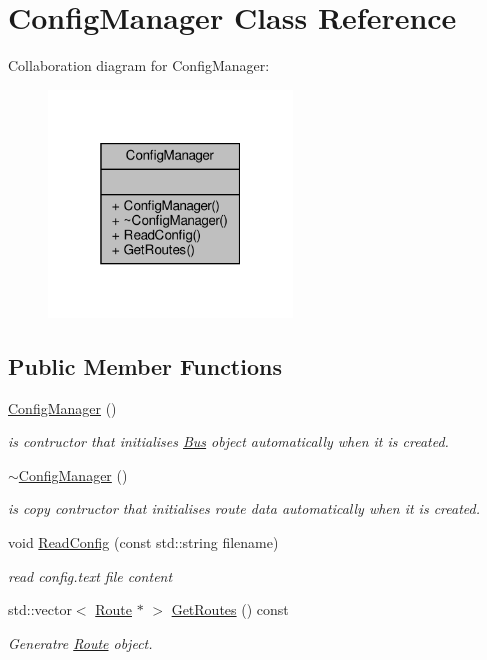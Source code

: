 \hypertarget{classConfigManager}{}\section{Config\+Manager Class Reference}
\label{classConfigManager}


Collaboration diagram for Config\+Manager\+:\nopagebreak
\begin{figure}[H]
\begin{center}
\leavevmode
\includegraphics[width=184pt]{classConfigManager__coll__graph}
\end{center}
\end{figure}
\subsection*{Public Member Functions}
\begin{DoxyCompactItemize}
\item 
\hyperlink{classConfigManager_a7d3d7c10423d969f7544509f6fcca32f}{Config\+Manager} ()
\begin{DoxyCompactList}\small\item\em is contructor that initialises \hyperlink{classBus}{Bus} object automatically when it is created. \end{DoxyCompactList}\item 
\hyperlink{classConfigManager_a7fa65fdff98bdd5bbbf72196bd9ccf17}{$\sim$\+Config\+Manager} ()
\begin{DoxyCompactList}\small\item\em is copy contructor that initialises route data automatically when it is created. \end{DoxyCompactList}\item 
void \hyperlink{classConfigManager_ab8087a9f44ddaa001ea361b56514e64a}{Read\+Config} (const std\+::string filename)
\begin{DoxyCompactList}\small\item\em read config.\+text file content \end{DoxyCompactList}\item 
std\+::vector$<$ \hyperlink{classRoute}{Route} $\ast$ $>$ \hyperlink{classConfigManager_a0db6329b7dd5ac1f92ee262c30df4ef9}{Get\+Routes} () const
\begin{DoxyCompactList}\small\item\em Generatre \hyperlink{classRoute}{Route} object. \end{DoxyCompactList}\end{DoxyCompactItemize}


